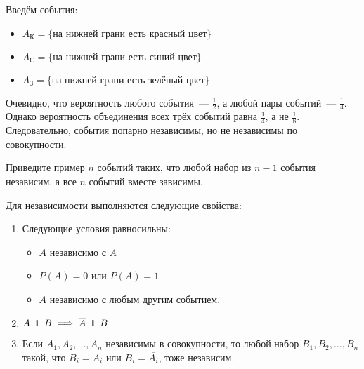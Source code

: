\documentclass[a4paper,12pt]{article}
\begin{document}
	Введём события:
	\begin{itemize}
		\item \(A_{\text{К}} = \{\text{на нижней грани есть красный цвет}\}\)
		\item \(A_{\text{С}} = \{\text{на нижней грани есть синий цвет}\}\)
		\item \(A_{\text{З}} = \{\text{на нижней грани есть зелёный цвет}\}\)
	\end{itemize}
	Очевидно, что вероятность любого события~--- \(\frac{1}{2}\), а любой пары событий~--- \(\frac{1}{4}\). Однако вероятность объединения всех трёх событий равна \(\frac{1}{4}\), а не \(\frac{1}{8}\). Следовательно, события попарно независимы, но не независимы по совокупности.
	\begin{exercise}
		Приведите пример \(n\) событий таких, что любой набор из \(n - 1\) события независим, а все \(n\) событий вместе зависимы.
	\end{exercise}
	
	Для независимости выполняются следующие свойства:
	\begin{enumerate}
		\item Следующие условия равносильны:
		\begin{itemize}
			\item \(A\) независимо с \(A\) \\
			\item \(P(A) = 0\) или \(P(A) = 1\) \\
			\item \(A\) независимо с любым другим событием.
		\end{itemize}
		 \item \(A \independent B \implies \overline{A} \independent B\)
		 \item Если \(A_1, A_2, \ldots, A_n\) независимы в совокупности, то любой набор \(B_1, B_2, \ldots, B_n\) такой, что \(B_i = A_i\) или \(B_i = \overline{A_i}\), тоже независим.
	\end{enumerate}
	
\end{document}
